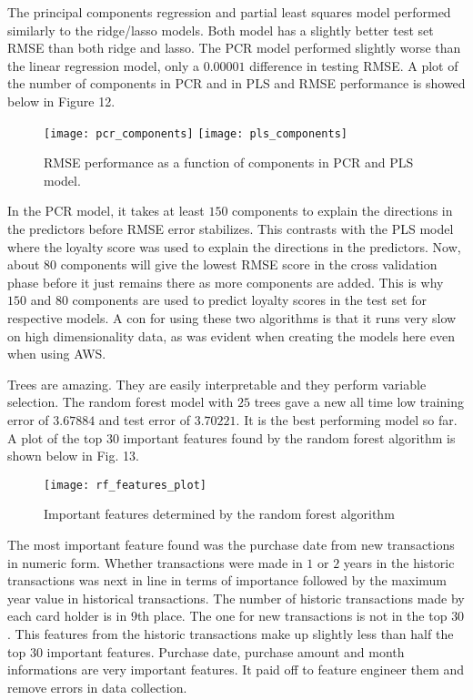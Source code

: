 \documentclass[journal, a4paper]{IEEEtran}
\begin{document}
The principal components regression and partial least squares model performed similarly to the ridge/lasso models. Both model has a slightly better test set RMSE than both ridge and lasso. The PCR model performed slightly worse than the linear regression model, only a $0.00001$ difference in testing RMSE. A plot of the number of components in PCR and in PLS and RMSE performance is showed below in Figure 12.  \begin{figure}[h] \texttt{[image: pcr\_components]} \texttt{[image: pls\_components]} \caption{RMSE performance as a function of components in PCR and PLS model.} \end{figure} In the PCR model, it takes at least $150$ components to explain the directions in the predictors before RMSE error stabilizes. This contrasts with the PLS model where the loyalty score was used to explain the directions in the predictors. Now, about $80$ components will give the lowest RMSE score in the cross validation phase before it just remains there as more components are added. This is why $150$ and $80$ components are used to predict loyalty scores in the test set for respective models. A con for using these two algorithms is that it runs very slow on high dimensionality data, as was evident when creating the models here even when using AWS. 

Trees are amazing. They are easily interpretable and they perform variable selection. The random forest model with $25$ trees gave a new all time low training error of $3.67884$ and test error of $3.70221$. It is the best performing model so far. A plot of the top $30$ important features found by the random forest algorithm is shown below in Fig. 13. \begin{figure}[ht] \texttt{[image: rf\_features\_plot]} \caption{Important features determined by the random forest algorithm} \end{figure} The most important feature found was the purchase date from new transactions in numeric form. Whether transactions were made in $1$ or $2$ years in the historic transactions was next in line in terms of importance followed by the maximum year value in historical transactions. The number of historic transactions made by each card holder is in $9$th place. The one for new transactions is not in the top $30$. This features from the historic transactions make up slightly less than half the top $30$ important features. Purchase date, purchase amount and month informations are very important features. It paid off to feature engineer them and remove errors in data collection. 
\end{document}

